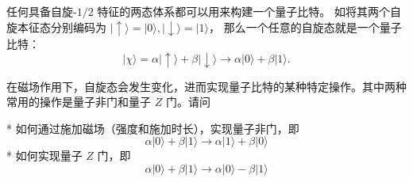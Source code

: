\begin{2}
    任何具备自旋-$1/2$ 特征的两态体系都可以用来构建一个量子比特。
    如将其两个自旋本征态分别编码为 $|\uparrow\rangle=|0\rangle,|\downarrow\rangle=|1\rangle$，
    那么一个任意的自旋态就是一个量子比特：
$$|\chi\rangle=\alpha|\uparrow\rangle+\beta|\downarrow\rangle 
\rightarrow \alpha|0\rangle+\beta|1\rangle.$$

在磁场作用下，自旋态会发生变化，进而实现量子比特的某种特定操作。其中两种常用的操作是量子非门和量子 $Z$ 门。请问

* 如何通过施加磁场（强度和施加时长），实现量子非门，即
$$\alpha|0\rangle+\beta|1\rangle \rightarrow \alpha|1\rangle+\beta|0\rangle$$
* 如何实现量子 $Z$ 门，即
$$\alpha|0\rangle+\beta|1\rangle \rightarrow \alpha|0\rangle-\beta|1\rangle$$

\end{2}
